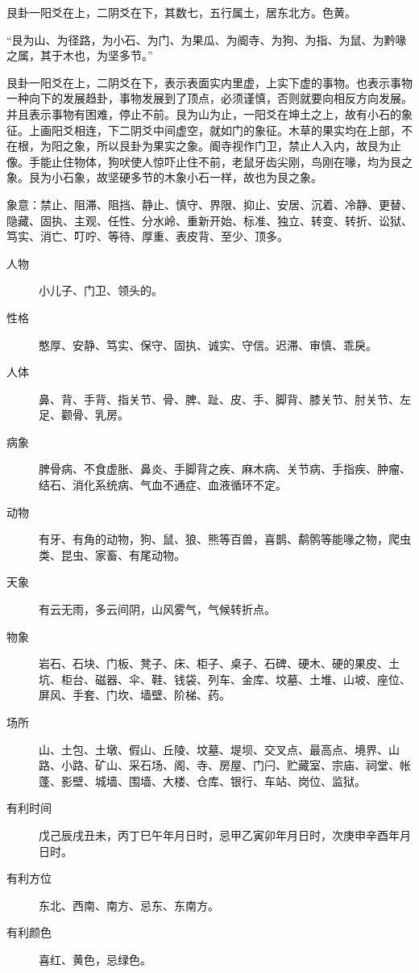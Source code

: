 \documentclass[12pt,oneside]{book}
\begin{document}
艮卦一阳爻在上，二阴爻在下，其数七，五行属土，居东北方。色黄。

“艮为山、为径路，为小石、为门、为果瓜、为阍寺、为狗、为指、为鼠、为黔喙之属，其于木也，为坚多节。”

艮卦一阳爻在上，二阴爻在下，表示表面实内里虚，上实下虚的事物。也表示事物一种向下的发展趋卦，事物发展到了顶点，必须谨慎，否则就要向相反方向发展。并且表示事物有困难，停止不前。艮为山为止，一阳爻在坤土之上，故有小石的象征。上画阳爻相连，下二阴爻中间虚空，就如门的象征。木草的果实均在上部，不在根，为阳之象，所以艮卦为果实之象。阍寺视作门卫，禁止人入内，故艮为止像。手能止住物体，狗吠使人惊吓止住不前，老鼠牙齿尖刚，鸟刚在喙，均为艮之象。艮为小石象，故坚硬多节的木象小石一样，故也为艮之象。


象意：禁止、阻滞、阻挡、静止、慎守、界限、抑止、安居、沉着、冷静、更替、隐藏、固执、主观、任性、分水岭、重新开始、标准、独立、转变、转折、讼狱、笃实、消亡、叮咛、等待、厚重、表皮背、至少、顶多。

\begin{description}
\item[人物] 小儿子、门卫、领头的。
\item[性格] 憨厚、安静、笃实、保守、固执、诚实、守信。迟滞、审慎、乖戾。
\item[人体] 鼻、背、手背、指关节、骨、脾、趾、皮、手、脚背、膝关节、肘关节、左足、颧骨、乳房。
\item[病象] 脾骨病、不食虚胀、鼻炎、手脚背之疾、麻木病、关节病、手指疾、肿瘤、结石、消化系统病、气血不通症、血液循环不定。
\item[动物] 有牙、有角的动物，狗、鼠、狼、熊等百兽，喜鹊、鹬鹘等能喙之物，爬虫类、昆虫、家畜、有尾动物。
\item[天象] 有云无雨，多云间阴，山风雾气，气候转折点。
\item[物象] 岩石、石块、门板、凳子、床、柜子、桌子、石碑、硬木、硬的果皮、土坑、柜台、磁器、伞、鞋、钱袋、列车、金库、坟墓、土堆、山坡、座位、屏风、手套、门坎、墙壁、阶梯、药。
\item[场所] 山、土包、土墩、假山、丘陵、坟墓、堤坝、交叉点、最高点、境界、山路、小路、矿山、采石场、阁、寺、房屋、门闩、贮藏室、宗庙、祠堂、帐蓬、影壁、城墙、围墙、大楼、仓库、银行、车站、岗位、监狱。
\item[有利时间] 戊己辰戌丑未，丙丁巳午年月日时，忌甲乙寅卯年月日时，次庚申辛酉年月日时。
\item[有利方位] 东北、西南、南方、忌东、东南方。
\item[有利颜色] 喜红、黄色，忌绿色。
\end{description}
\end{document}
